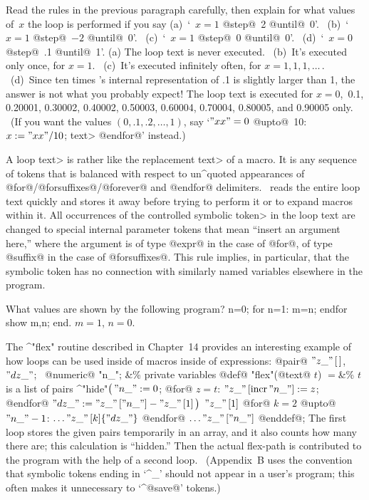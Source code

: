 \dangerexercise Read the rules in the previous paragraph carefully, then
explain for what values of~$x$ the loop is performed if you say
(a)~`\thinspace@for@~$x=1$ @step@~2 @until@~0'\thinspace. \
(b)~`\thinspace@for@~$x=1$ @step@~$-2$ @until@~0\thinspace'. \
(c)~`\thinspace@for@~$x=1$ @step@~0 @until@~0\thinspace'. \
(d)~`\thinspace@for@~$x=0$ @step@~.1 @until@~1\thinspace'.
\answer (a) The loop text is never executed. \
(b)~It's executed only once, for $x=1$. \
(c)~It's executed infinitely often, for $x=1,1,1,\ldots\,$. \
(d)~Since ten times \MF's internal representation of
.1 is slightly larger than 1, the answer
is not what you probably expect! The loop text is executed for
$x=0$,~0.1, 0.20001, 0.30002, 0.40002, 0.50003, 0.60004, 0.70004, 0.80005,
and 0.90005 only. \ (If you want the values $(0,.1,.2,\ldots,1)$, say
`\thinspace@for@ $"xx"=0$ @upto@~10: $x:="xx"/10$; \<text> @endfor@' instead.)

\danger A \<loop text> is rather like the \<replacement text> of a macro.
It is any sequence of tokens that is balanced with respect to
un^{quote}d appearances of @for@/@forsuffixes@/@forever@ and @endfor@
delimiters. \MF\ reads the entire loop text quickly and stores it away
before trying to perform it or to expand macros within it. All occurrences
of the controlled \<symbolic token> in the loop text are changed to
special internal parameter tokens that mean ``insert an argument here,''
where the argument is of type @expr@ in the case of @for@, of
type @suffix@ in the case of @forsuffixes@. This rule implies, in
particular, that the symbolic token has no connection with similarly
named variables elsewhere in the program.

\dangerexercise What values are shown by the following program?
\begintt
n=0; for n=1: m=n; endfor show m,n; end.
\endtt
\answer $m=1$, $n=0$.

\danger The ^"flex" routine described in Chapter~14 provides an interesting
example of how loops can be used inside of macros inside of expressions:
\begindisplay
@pair@ $"z\_"\,[\,]$, $"dz\_"$; \ @numeric@ "n\_"\thinspace;
 &\% private variables\cr
@def@ "flex"(@text@ $t$) $=$&\% $t$ is a list of pairs\cr
\quad^"hide"$\bigl(\,"n\_":=0$;\cr
\qquad @for@ $z=t$: $"z\_"\,[{\rm incr}\,"n\_"]:=z$; @endfor@\cr
\qquad $"dz\_":="z\_"\,["n\_"]-"z\_"\,[1]\,\bigr)$\cr
\quad $"z\_"\,[1]$ @for@ $k=2$ @upto@ $"n\_"-1$:
 $\ldots"z\_"\,[k]\{"dz\_"\}$ @endfor@\hidewidth\cr
\qquad $\ldots"z\_"\,["n\_"]$ @enddef@;\cr
\enddisplay
The first loop stores the given pairs temporarily in an array, and it also
counts how many there are; this calculation is ``hidden.'' Then
the actual flex-path is contributed to the program with the help of
a second loop. \ (Appendix~B uses the convention that symbolic tokens
ending in `^{\_}' should not appear in a user's program; this often
makes it unnecessary to `^@save@' tokens.)

